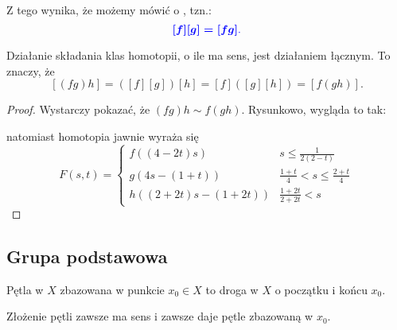 Z tego wynika, że możemy mówić o , tzn.: 
$$\color{blue}\boldsymbol{[f][g]=[fg]}.$$

\begin{lemma}[łączność]\label{lemma:1.3}
  Działanie składania klas homotopii, o ile ma sens, jest działaniem łącznym. To znaczy, że 
  $$[(fg)h]=([f][g])[h]=[f]([g][h])=[f(gh)].$$
\end{lemma}

\begin{proof}
  Wystarczy pokazać, że $(fg)h\sim f(gh)$. Rysunkowo, wygląda to tak:
  \begin{center}
  \end{center}
  natomiast homotopia jawnie wyraża się
  $$F(s, t)=\begin{cases}
    f((4-2t)s)&s\leq \frac{1}{2(2-t)}\\ 
    g(4s-(1+t))&\frac{1+t}{4}<s\leq \frac{2+t}{4}\\ 
    h((2+2t)s-(1+2t))&\frac{1+2t}{2+2t}<s
  \end{cases}$$
\end{proof}

\subsection{Grupa podstawowa}

\begin{definition}[pętla]
  Pętla w $X$ zbazowana w punkcie $x_0\in X$ to droga w $X$ o początku i końcu $x_0$.
\end{definition}

Złożenie pętli zawsze ma sens i zawsze daje pętle zbazowaną w $x_0$.

